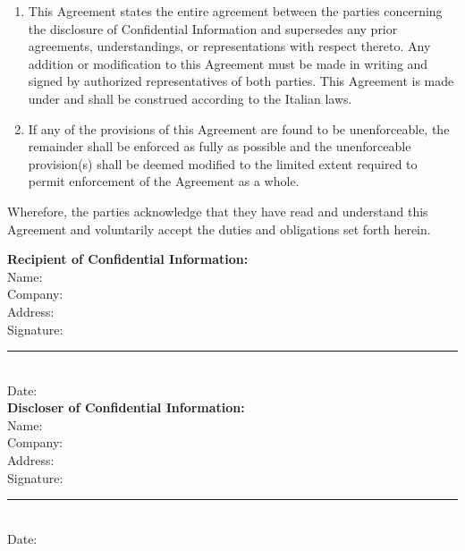 \documentclass[a4paper, 11pt, twoside]{article}
\begin{document}
\begin{enumerate}
\item This Agreement states the entire agreement between the parties concerning the disclosure of Confidential Information and supersedes any prior agreements, understandings, or representations with respect thereto. Any addition or modification to this Agreement must be made in writing and signed by authorized representatives of both parties. This Agreement is made under and shall be construed according to the Italian laws.

\item If any of the provisions of this Agreement are found to be unenforceable, the remainder shall be enforced as fully as possible and the unenforceable provision(s) shall be deemed modified to the limited extent required to permit enforcement of the Agreement as a whole.

\end{enumerate}

Wherefore, the parties acknowledge that they have read and understand this Agreement and voluntarily accept the duties and obligations set forth herein.

\textbf{Recipient of Confidential Information:}\\[0.5cm]
\noindent Name: \underline{\hspace{8cm}}\\[0.5cm]
\noindent Company: \underline{\hspace{8cm}}\\[0.5cm]
\noindent Address: \underline{\hspace{8cm}}\\[0.5cm]
\noindent Signature: \rule{8cm}{0.4pt}\\[0.5cm]
\noindent Date: \underline{\hspace{8cm}}\\[1cm]

\textbf{Discloser of Confidential Information:}\\[0.5cm]
\noindent Name: \underline{\hspace{8cm}}\\[0.5cm]
\noindent Company: \underline{\hspace{8cm}}\\[0.5cm]
\noindent Address: \underline{\hspace{8cm}}\\[0.5cm]
\noindent Signature: \rule{8cm}{0.4pt}\\[0.5cm]
\noindent Date: \underline{\hspace{8cm}}\\[1cm]
\end{document}
